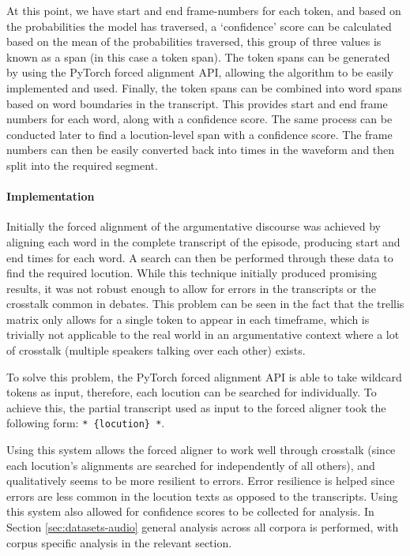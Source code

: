 \documentclass[twocolumn]{article}
\begin{document}
At this point, we have start and end frame-numbers for each token, and
based on the probabilities the model has traversed, a `confidence' score
can be calculated based on the mean of the probabilities traversed, this
group of three values is known as a span (in this case a token span).
The token spans can be generated by using the PyTorch forced alignment
API, allowing the algorithm to be easily implemented and used. Finally,
the token spans can be combined into word spans based on word boundaries
in the transcript. This provides start and end frame numbers for each
word, along with a confidence score. The same process can be conducted
later to find a locution-level span with a confidence score. The frame
numbers can then be easily converted back into times in the waveform and
then split into the required segment.

\paragraph{Implementation}\label{implementation}

Initially the forced alignment of the argumentative discourse was
achieved by aligning each word in the complete transcript of the
episode, producing start and end times for each word. A search can then
be performed through these data to find the required locution. While
this technique initially produced promising results, it was not robust
enough to allow for errors in the transcripts or the crosstalk common in
debates. This problem can be seen in the fact that the trellis matrix
only allows for a single token to appear in each timeframe, which is
trivially not applicable to the real world in an argumentative context
where a lot of crosstalk (multiple speakers talking over each other)
exists.

To solve this problem, the PyTorch forced alignment API is able to take
wildcard tokens as input, therefore, each locution can be searched for
individually. To achieve this, the partial transcript used as input to
the forced aligner took the following form: \mbox{\texttt{*\ \{locution\}\ *}}.

Using this system allows the forced aligner to work well through
crosstalk (since each locution's alignments are searched for
independently of all others), and qualitatively seems to be more
resilient to errors. Error resilience is helped since errors are less
common in the locution texts as opposed to the transcripts. Using this
system also allowed for confidence scores to be collected for analysis.
In Section \ref{sec:datasets-audio} general analysis across all corpora
is performed, with corpus specific analysis in the relevant section.
\end{document}
